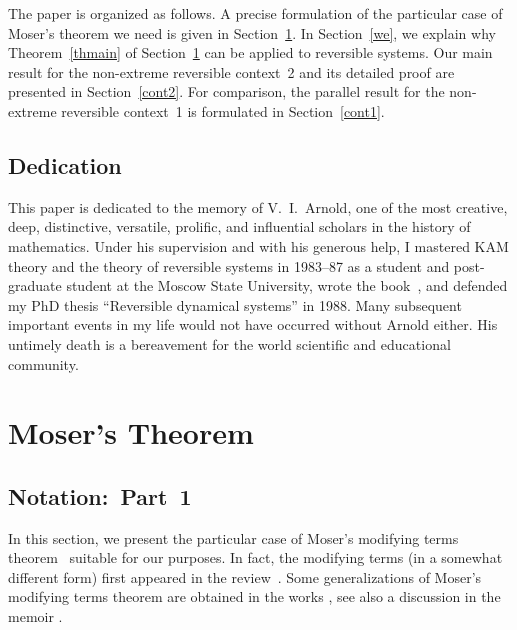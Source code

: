 \documentclass[12pt,reqno]{amsart}
\theoremstyle{definition}
\begin{document}
The paper is organized as follows. A precise formulation of the particular
case of Moser's theorem we need is given in Section~\ref{Moser}. In
Section~\ref{we}, we explain why Theorem~\ref{thmain} of Section~\ref{Moser}
can be applied to reversible systems. Our main result for the non-extreme
reversible context~2 and its detailed proof are presented in
Section~\ref{cont2}. For comparison, the parallel result for the non-extreme
reversible context~1 is formulated in Section~\ref{cont1}.

\subsection{Dedication}\label{Arnold}

This paper is dedicated to the memory of V.~I.~Arnold, one of the most
creative, deep, distinctive, versatile, prolific, and influential scholars in
the history of mathematics. Under his supervision and with his generous help,
I mastered KAM theory and the theory of reversible systems in \mbox{1983--87}
as a student and post-graduate student at the Moscow State University, wrote
the book~\cite{S86}, and defended my PhD thesis ``Reversible dynamical
systems'' in 1988. Many subsequent important events in my life would not have
occurred without Arnold either. His untimely death is a bereavement for the
world scientific and educational community.

\section{Moser's Theorem}\label{Moser}

\subsection{Notation:\ Part~1}\label{nota1}

In this section, we present the particular case of Moser's modifying terms
theorem~\cite{M67} suitable for our purposes. In fact, the modifying terms
(in a somewhat different form) first appeared in the review~\cite{M66}. Some
generalizations of Moser's modifying terms theorem are obtained in the works
\cite{B73,B91,CGP11,Sch87,S11,Wa10}, see also a discussion in the memoir
\cite[Part~I,~\S\,7\textbf{b}]{BHTB90}.
\end{document}

